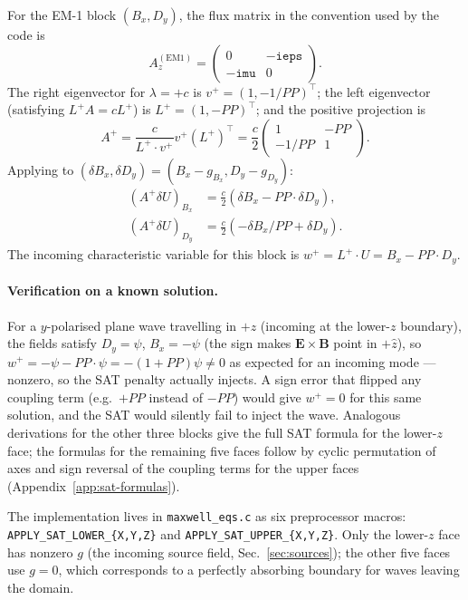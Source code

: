 \documentclass[11pt]{article}
\newcommand{\vE}{\mathbf{E}}
\newcommand{\vB}{\mathbf{B}}
\newcommand{\hz}{\hat{z}}
\begin{document}
For the EM-1 block $(B_x, D_y)$, the flux matrix in the convention used
by the code is
\begin{equation}
  A_z^{(\mathrm{EM1})} = \begin{pmatrix} 0 & -\mathtt{ieps} \\ -\mathtt{imu} & 0 \end{pmatrix}.
\end{equation}
The right eigenvector for $\lambda = +c$ is $v^+ = (1, -1/PP)^\top$;
the left eigenvector (satisfying $L^+ A = c L^+$) is $L^+ = (1, -PP)^\top$;
and the positive projection is
\begin{equation}
  A^+ = \frac{c}{L^+ \cdot v^+} v^+ (L^+)^\top = \frac{c}{2}
    \begin{pmatrix} 1 & -PP \\ -1/PP & 1 \end{pmatrix}.
\end{equation}
Applying to $(\delta B_x, \delta D_y) = (B_x - g_{B_x}, D_y - g_{D_y})$:
\begin{align}
  (A^+ \delta U)_{B_x} &= \tfrac{c}{2} (\delta B_x - PP \cdot \delta D_y), \\
  (A^+ \delta U)_{D_y} &= \tfrac{c}{2} (-\delta B_x / PP + \delta D_y).
\end{align}
The incoming characteristic variable for this block is
$w^+ = L^+ \cdot U = B_x - PP \cdot D_y$.

\paragraph{Verification on a known solution.} For a $y$-polarised
plane wave travelling in $+z$ (incoming at the lower-$z$ boundary), the
fields satisfy $D_y = \psi$, $B_x = -\psi$ (the sign makes $\vE \times \vB$
point in $+\hz$), so
$w^+ = -\psi - PP \cdot \psi = -(1+PP)\psi \ne 0$ as expected for an
incoming mode — nonzero, so the SAT penalty actually injects. A sign
error that flipped any coupling term (e.g.\ $+PP$ instead of $-PP$)
would give $w^+ = 0$ for this same solution, and the SAT would
silently fail to inject the wave. Analogous derivations for the other
three blocks give the full SAT formula for the lower-$z$ face; the
formulas for the remaining five faces follow by cyclic permutation of
axes and sign reversal of the coupling terms for the upper faces
(Appendix~\ref{app:sat-formulas}).

The implementation lives in \texttt{maxwell\_eqs.c} as six preprocessor
macros: \texttt{APPLY\_SAT\_LOWER\_\{X,Y,Z\}} and
\texttt{APPLY\_SAT\_UPPER\_\{X,Y,Z\}}. Only the lower-$z$ face has
nonzero $g$ (the incoming source field, Sec.~\ref{sec:sources}); the
other five faces use $g = 0$, which corresponds to a perfectly
absorbing boundary for waves leaving the domain.
\end{document}
